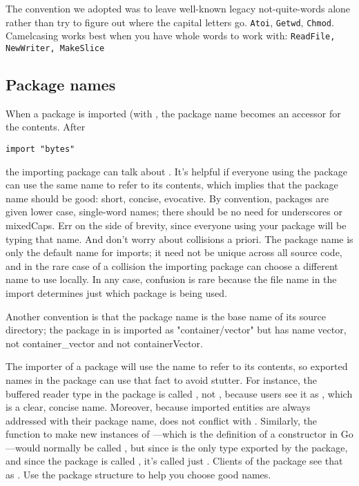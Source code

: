 The convention we adopted was to leave well-known legacy
not-quite-words alone rather than try to figure out where
the capital letters go.  \lstinline{Atoi}, \lstinline{Getwd},
\lstinline{Chmod}.
Camelcasing works best when you have whole words
to work with: \lstinline{ReadFile, NewWriter, MakeSlice}

\subsection{Package names}
When a package is imported (with , the package name becomes 
an accessor for the contents. After
\begin{lstlisting}
import "bytes"
\end{lstlisting}
the importing package can talk about . It's helpful if
everyone using the package can use the same name to refer to its
contents, which implies that the package name should be good: short,
concise, evocative. By convention, packages are given lower case,
single-word names; there should be no need for underscores or mixedCaps.
Err on the side of brevity, since everyone using your package will be
typing that name. And don't worry about collisions a priori. The package
name is only the default name for imports; it need not be unique across
all source code, and in the rare case of a collision the importing
package can choose a different name to use locally. In any case,
confusion is rare because the file name in the import determines just
which package is being used.

Another convention is that the package name is the base name of its
source directory; the package in  is imported as
"container/vector" but has name vector, not container\_vector and not
containerVector.

The importer of a package will use the name to refer to its contents, so 
exported names in the package can use that fact to avoid
stutter. For instance, the buffered reader type in the  package is
called , not , because users see it as
,
which is a clear, concise name. Moreover, because imported entities are
always addressed with their package name,  does not conflict
with . Similarly, the function to make new instances of
---which is the definition of a constructor in Go---would normally
be called , but since  is the only type exported by the
package, and since the package is called , it's called
just .
Clients of the package see that as . Use the package structure
to help you choose good names.

